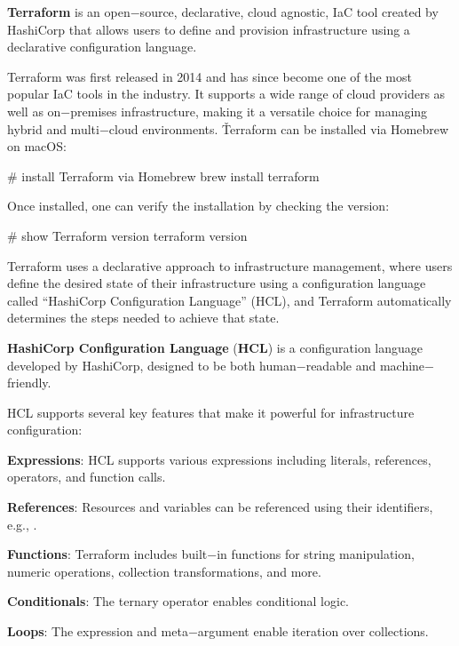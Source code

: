 \bd[Terraform]
\textbf{Terraform} is an open$-$source, declarative, cloud agnostic, IaC tool created by HashiCorp that allows users to
define and provision infrastructure using a declarative configuration language.
\ed

Terraform was first released in 2014 and has since become one of the most popular IaC tools in the industry. It
supports a wide range of cloud providers as well as on$-$premises infrastructure, making it a versatile choice for
managing hybrid and multi$-$cloud environments. \v

Terraform can be installed via Homebrew on macOS:

\begin{bash}
# install Terraform via Homebrew
brew install terraform
\end{bash}

Once installed, one can verify the installation by checking the version:

\begin{bash}
# show Terraform version
terraform version
\end{bash}

Terraform uses a declarative approach to infrastructure management, where users define the desired state of their
infrastructure using a configuration language called ``HashiCorp Configuration Language'' (HCL), and Terraform
automatically determines the steps needed to achieve that state.

\textbf{HashiCorp Configuration Language} (\textbf{HCL}) is a configuration language developed by HashiCorp, designed
to be both human$-$readable and machine$-$friendly.
\ed

HCL supports several key features that make it powerful for infrastructure configuration:
\bit
\item \textbf{Expressions}: HCL supports various expressions including literals, references, operators, and function
calls.
\item \textbf{References}: Resources and variables can be referenced using their identifiers, e.g., .
\item \textbf{Functions}: Terraform includes built$-$in functions for string manipulation, numeric operations,
collection transformations, and more.
\item \textbf{Conditionals}: The ternary operator  enables conditional
logic.
\item \textbf{Loops}: The  expression and  meta$-$argument enable iteration over
collections.
\eit

